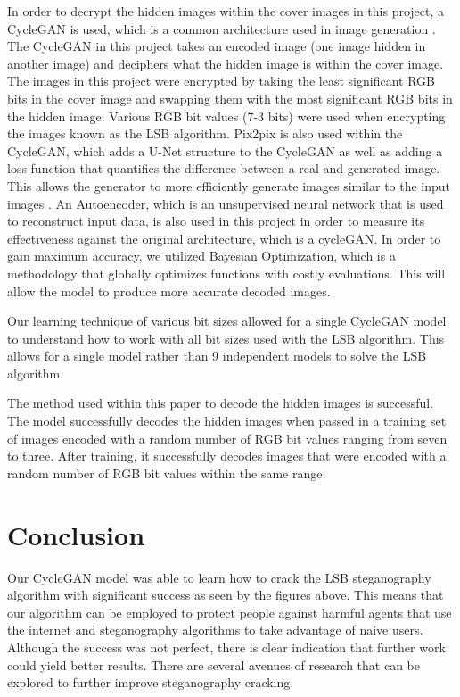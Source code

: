 \documentclass[conference]{IEEEtran}
\begin{document}
In order to decrypt the hidden images within the cover images in this project, a CycleGAN is used, which is a common architecture used in image generation \cite{welander_generative_2018}. The CycleGAN in this project takes an encoded image (one image hidden in another image) and deciphers what the hidden image is within the cover image. The images in this project were encrypted by taking the least significant RGB bits in the cover image and swapping them with the most significant RGB bits in the hidden image. Various RGB bit values (7-3 bits) were used when encrypting the images known as the LSB algorithm. Pix2pix is also used within the CycleGAN, which adds a U-Net structure to the CycleGAN as well as adding a loss function that quantifies the difference between a real and generated image. This allows the generator to more efficiently generate images similar to the input images \cite{meng_steganography_2019}. An Autoencoder, which is an unsupervised neural network that is used to reconstruct input data, is also used in this project in order to measure its effectiveness against the original architecture, which is a cycleGAN. In order to gain maximum accuracy, we utilized Bayesian Optimization, which is a methodology that globally optimizes functions with costly evaluations. This will allow the model to produce more accurate decoded images. 

Our learning technique of various bit sizes allowed for a single CycleGAN model to understand how to work with all bit sizes used with the LSB algorithm. This allows for a single model rather than 9 independent models to solve the LSB algorithm.

The method used within this paper to decode the hidden images is successful. The model successfully decodes the hidden images when passed in a training set of images encoded with a random number of RGB bit values ranging from seven to three. After training, it successfully decodes images that were encoded with a random number of RGB bit values within the same range. 

\section{Conclusion}
Our CycleGAN model was able to learn how to crack the LSB steganography algorithm with significant success as seen by the figures above. This means that our algorithm can be employed to protect people against harmful agents that use the internet and steganography algorithms to take advantage of naive users. Although the success was not perfect, there is clear indication that further work could yield better results. There are several avenues of research that can be explored to further improve steganography cracking. 
\end{document}
